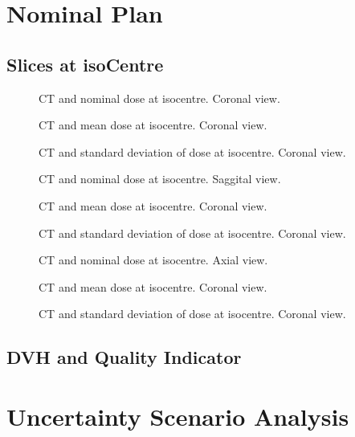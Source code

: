 \documentclass[a4paper]{scrartcl}
\begin{document}
\FloatBarrier
\newpage

\section{Nominal Plan}
\subsection{Slices at isoCentre}
\begin{figure}[!b]
  \centering
  
  \caption{CT and nominal dose at isocentre. Coronal view.}
\end{figure}

\begin{figure}[!b]
  \centering
  
  \caption{CT and mean dose at isocentre. Coronal view.}
\end{figure}

\begin{figure}[!b]
  \centering
  
  \caption{CT and standard deviation of dose at isocentre. Coronal view.}
\end{figure}

\begin{figure}[!b]
  \centering
  
  \caption{CT and nominal dose at isocentre. Saggital view.}
\end{figure}

\begin{figure}[!b]
  \centering
  
  \caption{CT and mean dose at isocentre. Coronal view.}
\end{figure}

\begin{figure}[!b]
  \centering
  
  \caption{CT and standard deviation of dose at isocentre. Coronal view.}
\end{figure}

\begin{figure}[!b]
  \centering
  
  \caption{CT and nominal dose at isocentre. Axial view.}
\end{figure}

\begin{figure}[!b]
  \centering
  
  \caption{CT and mean dose at isocentre. Coronal view.}
\end{figure}

\begin{figure}[!b]
  \centering
  
  \caption{CT and standard deviation of dose at isocentre. Coronal view.}
\end{figure}

\FloatBarrier

\newpage
\subsection{DVH and Quality Indicator}
\begin{center}

\end{center}


\FloatBarrier
\newpage
\section{Uncertainty Scenario Analysis}
\label{sec:usa}


\end{document}

